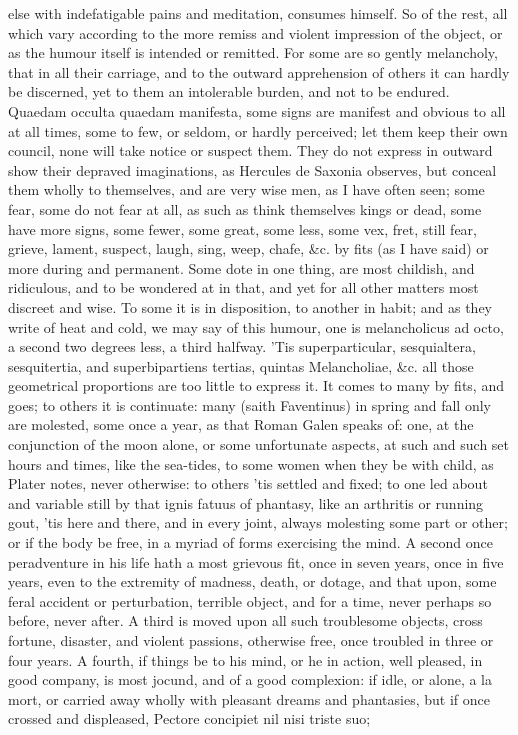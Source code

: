 {else with indefatigable pains and meditation, consumes himself. So of
the rest, all which vary according to the more remiss and violent
impression of the object, or as the humour itself is intended or
remitted. For some are so gently melancholy, that in all their
carriage, and to the outward apprehension of others it can hardly be
discerned, yet to them an intolerable burden, and not to be endured.
Quaedam occulta quaedam manifesta, some signs are manifest and
obvious to all at all times, some to few, or seldom, or hardly
perceived; let them keep their own council, none will take notice or
suspect them. They do not express in outward show their depraved
imaginations, as Hercules de Saxonia observes, but conceal them
wholly to themselves, and are very wise men, as I have often seen; some
fear, some do not fear at all, as such as think themselves kings or
dead, some have more signs, some fewer, some great, some less, some
vex, fret, still fear, grieve, lament, suspect, laugh, sing, weep,
chafe, \&c. by fits (as I have said) or more during and permanent. Some
dote in one thing, are most childish, and ridiculous, and to be
wondered at in that, and yet for all other matters most discreet and
wise. To some it is in disposition, to another in habit; and as they
write of heat and cold, we may say of this humour, one is melancholicus
ad octo, a second two degrees less, a third halfway. 'Tis
superparticular, sesquialtera, sesquitertia, and superbipartiens
tertias, quintas Melancholiae, \&c. all those geometrical proportions
are too little to express it. It comes to many by fits, and goes;
to others it is continuate: many (saith Faventinus) in spring and
fall only are molested, some once a year, as that Roman  Galen
speaks of: one, at the conjunction of the moon alone, or some
unfortunate aspects, at such and such set hours and times, like the
sea-tides, to some women when they be with child, as Plater
notes, never otherwise: to others 'tis settled and fixed; to one led
about and variable still by that ignis fatuus of phantasy, like an
arthritis or running gout, 'tis here and there, and in every joint,
always molesting some part or other; or if the body be free, in a
myriad of forms exercising the mind. A second once peradventure in his
life hath a most grievous fit, once in seven years, once in five years,
even to the extremity of madness, death, or dotage, and that upon, some
feral accident or perturbation, terrible object, and for a time, never
perhaps so before, never after. A third is moved upon all such
troublesome objects, cross fortune, disaster, and violent passions,
otherwise free, once troubled in three or four years. A fourth, if
things be to his mind, or he in action, well pleased, in good company,
is most jocund, and of a good complexion: if idle, or alone, a la mort,
or carried away wholly with pleasant dreams and phantasies, but if once
crossed and displeased,
Pectore concipiet nil nisi triste suo;

}
